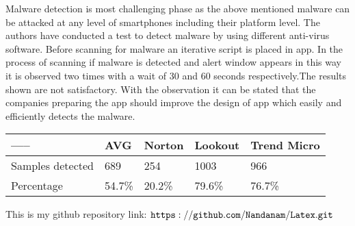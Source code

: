 \documentclass{article}
\begin{document}
Malware detection is most challenging phase as the above mentioned malware can be attacked at any level of smartphones including their platform level. The authors have conducted a test to detect malware by using different anti-virus software. Before scanning for malware an iterative script is placed in app. In the process of scanning if malware is detected and alert window appears in this way it is observed two times with a wait of 30 and 60 seconds respectively.The results shown are not satisfactory. With the observation it can be stated that the companies preparing the app should improve the design of app which easily and efficiently detects the malware.\\

\begin{table}
\centering
\begin{tabular}{ |p{2cm}||p{2cm}| |p{2cm}||p{2cm}||p{2cm}|}
\hline
 -----& AVG & Norton & Lookout & Trend Micro\\
\hline
Samples detected & 689 & 254 & 1003 & 966\\
\hline
Percentage & 54.7\% & 20.2\% & 79.6\% & 76.7\%\\
\hline
\end{tabular}
\end{table}
This is my github repository link: {$\tt https://github.com/Nandanam/Latex.git$}
\end{document}
